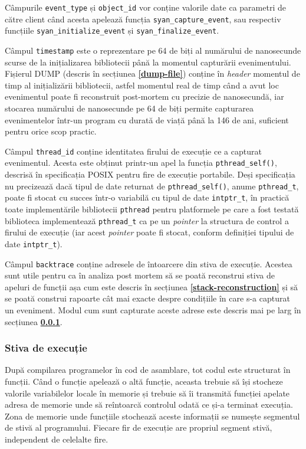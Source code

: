 Câmpurile \lstinline{event_type} și \lstinline{object_id} vor conține
valorile date ca parametri de către client când acesta apelează funcția
\lstinline{syan_capture_event}, sau respectiv funcțiile
\lstinline{syan_initialize_event} și \lstinline{syan_finalize_event}.

Câmpul \lstinline{timestamp} este o reprezentare pe 64 de biți al
numărului de nanosecunde scurse de la inițializarea bibliotecii până la
momentul capturării evenimentului. Fișierul DUMP (descris în secțiunea
\textbf{\ref{dump-file}}) conține în \textit{header} momentul de timp al
inițializării bibliotecii, astfel momentul real de timp când a avut loc
evenimentul poate fi reconstruit post-mortem cu precizie de nanosecundă,
iar stocarea numărului de nanosecunde pe 64 de biți permite capturarea
evenimentelor într-un program cu durată de viață până la 146 de ani,
suficient pentru orice scop practic.

Câmpul \lstinline{thread_id} conține identitatea firului de execuție ce
a capturat evenimentul. Acesta este obținut printr-un apel la funcția
\lstinline{pthread_self()}, descrisă în specificația POSIX pentru fire
de execuție portabile\cite{pthread}. Deși specificația nu precizează
dacă tipul de date returnat de \lstinline{pthread_self()}, anume
\lstinline{pthread_t}, poate fi stocat cu succes într-o variabilă cu
tipul de date \lstinline{intptr_t}, în practică toate implementările
bibliotecii \lstinline{pthread} pentru platformele pe care a fost
testată biblioteca implementează \lstinline{pthread_t} ca pe un
\textit{pointer} la structura de control a firului de execuție (iar
acest \textit{pointer} poate fi stocat, conform definiției tipului de
date \lstinline{intptr_t}).

Câmpul \lstinline{backtrace} conține adresele de întoarcere din stiva de
execuție. Acestea sunt utile pentru ca în analiza post mortem să se
poată reconstrui stiva de apeluri de funcții așa cum este descris în
secțiunea \textbf{\ref{stack-reconstruction}} și să se poată construi
rapoarte cât mai exacte despre condițiile în care s-a capturat un
eveniment. Modul cum sunt capturate aceste adrese este descris mai pe
larg în secțiunea \textbf{\ref{stack-unwinding}}.

\subsubsection{Stiva de execuție}\label{stack-unwinding}

După compilarea programelor în cod de asamblare, tot codul este
structurat în funcții. Când o funcție apelează o altă funcție, aceasta
trebuie să își stocheze valorile variabilelor locale în memorie și
trebuie să îi transmită funcției apelate adresa de memorie unde să
reîntoarcă controlul odată ce și-a terminat execuția. Zona de memorie
unde funcțiile stochează aceste informații se numește segmentul de stivă
al programului. Fiecare fir de execuție are propriul segment stivă,
independent de celelalte fire.

